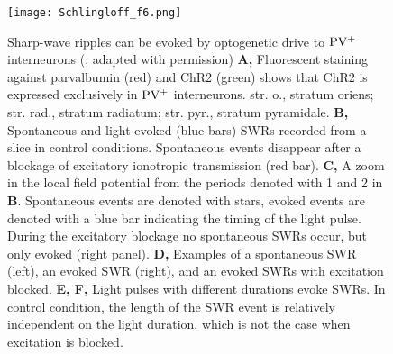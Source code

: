     \begin{figure}
      \center
      \texttt{[image: Schlingloff\_f6.png]}
      \caption{
        Sharp-wave ripples can be evoked by optogenetic drive to $\rm PV^+$ interneurons
        (\citealp{Schlingloff2014}; adapted with permission)
        {\bf A,} Fluorescent staining against parvalbumin (red) and ChR2
        (green) shows that ChR2 is expressed exclusively in $\rm PV^+$
        interneurons. str. o., stratum oriens; str. rad., stratum radiatum;
        str. pyr., stratum pyramidale.
        {\bf B,} Spontaneous and light-evoked (blue bars) SWRs recorded from a
        slice in control conditions. Spontaneous events disappear after a
        blockage of excitatory ionotropic transmission (red bar). 
        {\bf C,} A zoom in the local field potential from the periods denoted
        with 1 and 2 in \textbf{B}. Spontaneous events are denoted with stars,
        evoked events are denoted with a blue bar indicating the timing of the
        light pulse. During the excitatory blockage no spontaneous SWRs occur,
        but only evoked (right panel).
        {\bf D,} Examples of a spontaneous SWR (left), an evoked SWR (right),
        and an evoked SWRs with excitation blocked.
        {\bf E, F,} Light pulses with different durations evoke SWRs. In
        control condition, the length of the SWR event is relatively independent
        on the light duration, which is not the case when excitation is blocked.
             }
    \label{fig:Schlingloff6}
    \end{figure}

